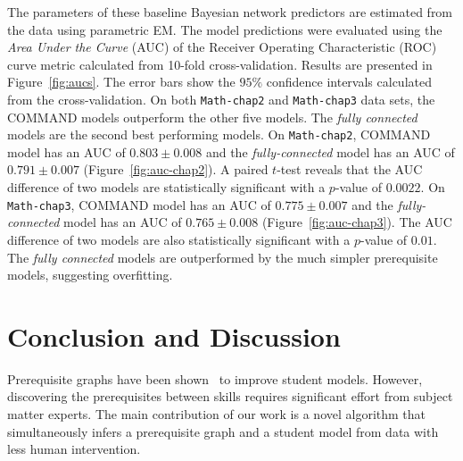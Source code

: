 \documentclass{edm_template}
\newcommand{\hl}[1]{\colorbox{yellow}{#1}}
\begin{document}
	The parameters of these baseline Bayesian network predictors are estimated from the data using parametric EM.
	The model predictions were evaluated using the \textit{Area Under the Curve} (AUC) of the Receiver Operating Characteristic (ROC) curve metric 
	calculated from 10-fold cross-validation.
	Results are presented in Figure~\ref{fig:aucs}. 
	The error bars show the $95\%$ confidence intervals calculated from the cross-validation.
	On both \texttt{Math-chap2} and \texttt{Math-chap3} data sets, the COMMAND models outperform the other five models.
	The \emph{fully connected} models are the second best performing models.
	On \texttt{Math-chap2}, COMMAND model has an AUC of $0.803\pm0.008$ and the \emph{fully-connected} model has an AUC of $0.791\pm0.007$ (Figure~\ref{fig:auc-chap2}).
	A paired $t$-test reveals that the AUC difference of two models are statistically significant with a $p$-value of $0.0022$.
	On \texttt{Math-chap3}, COMMAND model has an AUC of $0.775\pm0.007$ and the \emph{fully-connected} model has an AUC of $0.765\pm0.008$ (Figure~\ref{fig:auc-chap3}).
	The AUC difference of two models are also statistically significant with a $p$-value of $0.01$.
	The \emph{fully connected} models are outperformed by the much simpler prerequisite models, suggesting overfitting.
	
	
	
	
	\section{Conclusion and Discussion \label{sec:conclusion}}
	Prerequisite graphs have been shown~\cite{botelho2015prediction,kaser2014beyond} to improve student models.
	However, discovering the prerequisites between skills requires significant effort from subject matter experts.
	The main contribution of our work is a novel algorithm that simultaneously infers a prerequisite graph and a student model from data with less human intervention.
	
\end{document}
